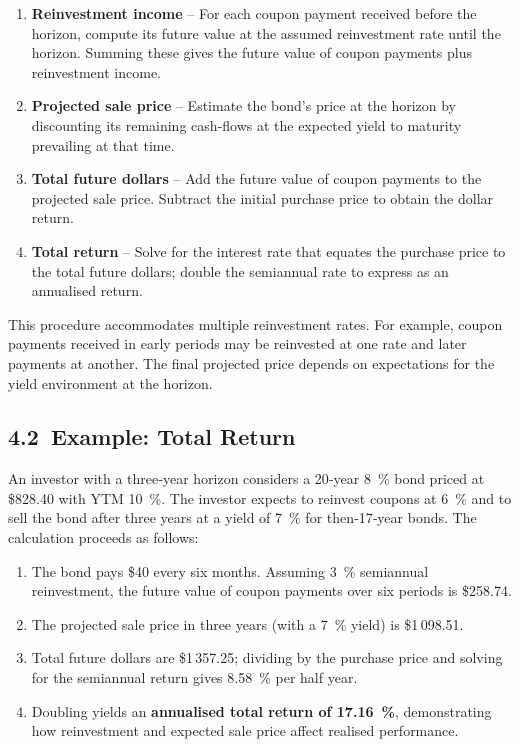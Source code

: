 \documentclass[
  letterpaper,
  DIV=11,
  numbers=noendperiod]{scrartcl}
\providecommand{\tightlist}{%
  \setlength{\itemsep}{0pt}\setlength{\parskip}{0pt}}
\begin{document}
\begin{enumerate}
\def\labelenumi{\arabic{enumi}.}
\tightlist
\item
  \textbf{Reinvestment income} -- For each coupon payment received
  before the horizon, compute its future value at the assumed
  reinvestment rate until the horizon. Summing these gives the future
  value of coupon payments plus reinvestment income.
\item
  \textbf{Projected sale price} -- Estimate the bond's price at the
  horizon by discounting its remaining cash‑flows at the expected yield
  to maturity prevailing at that time.
\item
  \textbf{Total future dollars} -- Add the future value of coupon
  payments to the projected sale price. Subtract the initial purchase
  price to obtain the dollar return.
\item
  \textbf{Total return} -- Solve for the interest rate that equates the
  purchase price to the total future dollars; double the semiannual rate
  to express as an annualised return.
\end{enumerate}

This procedure accommodates multiple reinvestment rates. For example,
coupon payments received in early periods may be reinvested at one rate
and later payments at another. The final projected price depends on
expectations for the yield environment at the horizon.

\subsection{4.2~Example: Total Return}\label{example-total-return}

An investor with a three‑year horizon considers a 20‑year 8~\% bond
priced at \$828.40 with YTM 10~\%. The investor expects to reinvest
coupons at 6~\% and to sell the bond after three years at a yield of
7~\% for then‑17‑year bonds. The calculation proceeds as follows:

\begin{enumerate}
\def\labelenumi{\arabic{enumi}.}
\tightlist
\item
  The bond pays \$40 every six months. Assuming 3~\% semiannual
  reinvestment, the future value of coupon payments over six periods is
  \$258.74.
\item
  The projected sale price in three years (with a 7~\% yield) is
  \$1\,098.51.
\item
  Total future dollars are \$1\,357.25; dividing by the purchase price
  and solving for the semiannual return gives 8.58~\% per half year.
\item
  Doubling yields an \textbf{annualised total return of 17.16~\%},
  demonstrating how reinvestment and expected sale price affect realised
  performance.
\end{enumerate}
\end{document}

